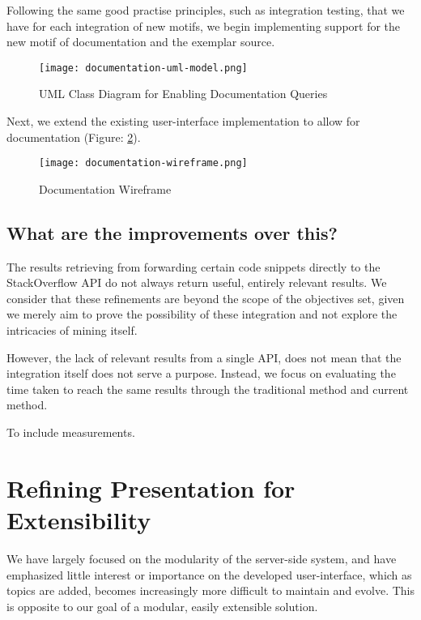 Following the same good practise principles, such as integration testing, that we have for each integration of new motifs, we begin implementing support for the new motif of documentation and the exemplar source. 

\begin{figure}[h!]
	\centering
	\texttt{[image: documentation-uml-model.png]}
	\caption{UML Class Diagram for Enabling Documentation Queries}
	\label{fig:documentationUmlClass}
\end{figure}

Next, we extend the existing user-interface implementation to allow for documentation (Figure: \ref{fig:documentationWireframe}).

\begin{figure}[h!]
	\centering
	\texttt{[image: documentation-wireframe.png]}
	\caption{Documentation Wireframe}
	\label{fig:documentationWireframe}
\end{figure}

\subsection{What are the improvements over this?}

The results retrieving from forwarding certain code snippets directly to the StackOverflow API do not always return useful, entirely relevant results. We consider that these refinements are beyond the scope of the objectives set, given we merely aim to prove the possibility of these integration and not explore the intricacies of mining itself.

However, the lack of relevant results from a single API, does not mean that the integration itself does not serve a purpose. Instead, we focus on evaluating the time taken to reach the same results through the traditional method and current method.

To include measurements.

\section{Refining Presentation for Extensibility}

We have largely focused on the modularity of the server-side system, and have emphasized little interest or importance on the developed user-interface, which as topics are added, becomes increasingly more difficult to maintain and evolve. This is opposite to our goal of a modular, easily extensible solution.

